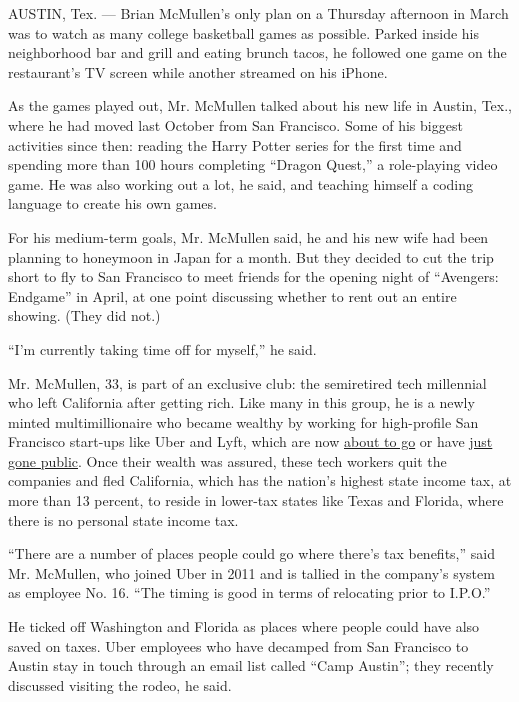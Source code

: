 AUSTIN, Tex. --- Brian McMullen's only plan on a Thursday afternoon in
March was to watch as many college basketball games as possible. Parked
inside his neighborhood bar and grill and eating brunch tacos, he
followed one game on the restaurant's TV screen while another streamed
on his iPhone.

As the games played out, Mr. McMullen talked about his new life in
Austin, Tex., where he had moved last October from San Francisco. Some
of his biggest activities since then: reading the Harry Potter series
for the first time and spending more than 100 hours completing ``Dragon
Quest,'' a role-playing video game. He was also working out a lot, he
said, and teaching himself a coding language to create his own games.

For his medium-term goals, Mr. McMullen said, he and his new wife had
been planning to honeymoon in Japan for a month. But they decided to cut
the trip short to fly to San Francisco to meet friends for the opening
night of ``Avengers: Endgame'' in April, at one point discussing whether
to rent out an entire showing. (They did not.)

``I'm currently taking time off for myself,'' he said.

Mr. McMullen, 33, is part of an exclusive club: the semiretired tech
millennial who left California after getting rich. Like many in this
group, he is a newly minted multimillionaire who became wealthy by
working for high-profile San Francisco start-ups like Uber and Lyft,
which are now
\href{https://www.nytimes3xbfgragh.onion/2019/04/26/technology/uber-ipo-valuation-price-range.html?rref=collection\%2Fbyline\%2Fkate-conger\&action=click\&contentCollection=undefined\&region=stream\&module=stream_unit\&version=latest\&contentPlacement=1\&pgtype=collection}{about
to go} or have
\href{https://www.nytimes3xbfgragh.onion/2019/03/29/technology/lyft-stock-price.html}{just
gone public}. Once their wealth was assured, these tech workers quit the
companies and fled California, which has the nation's highest state
income tax, at more than 13 percent, to reside in lower-tax states like
Texas and Florida, where there is no personal state income tax.

``There are a number of places people could go where there's tax
benefits,'' said Mr. McMullen, who joined Uber in 2011 and is tallied in
the company's system as employee No. 16. ``The timing is good in terms
of relocating prior to I.P.O.''

He ticked off Washington and Florida as places where people could have
also saved on taxes. Uber employees who have decamped from San Francisco
to Austin stay in touch through an email list called ``Camp Austin'';
they recently discussed visiting the rodeo, he said.

